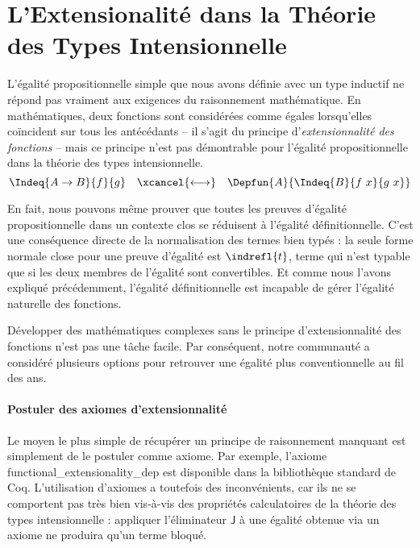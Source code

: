 \section{L'Extensionalité dans la Théorie des Types Intensionnelle}

L'égalité propositionnelle simple que nous avons définie avec un type inductif 
ne répond pas vraiment aux exigences du raisonnement mathématique. 
% 
En mathématiques, deux fonctions sont considérées comme égales lorsqu'elles 
coïncident sur tous les antécédants -- il s'agit du principe 
d'\emph{extensionnalité des fonctions} -- 
% 
% 
mais ce principe n'est pas démontrable pour l'égalité propositionnelle dans 
la théorie des types intensionnelle.
\[
  \Indeq{A \to B}{f}{g} \quad \xcancel{\longleftrightarrow} \quad \Depfun{A}{\Indeq{B}{f\ x}{g\ x}}
\]

En fait, nous pouvons même prouver que toutes les preuves d'égalité 
propositionnelle dans un contexte clos se réduisent à l'égalité définitionnelle. 
% 
C'est une conséquence directe de la normalisation des termes bien typés : 
la seule forme normale close pour une preuve d'égalité est \( \indrefl{t} \), 
terme qui n'est typable que si les deux membres de l'égalité sont convertibles. 
% 
Et comme nous l'avons expliqué précédemment, l'égalité définitionnelle est 
incapable de gérer l'égalité naturelle des fonctions. 

Développer des mathématiques complexes sans le principe d'extensionnalité 
des fonctions n'est pas une tâche facile. Par conséquent, notre communauté a 
considéré plusieurs options pour retrouver une égalité plus conventionnelle au 
fil des ans.

\paragraph*{Postuler des axiomes d'extensionnalité}
% 
Le moyen le plus simple de récupérer un principe de raisonnement manquant 
est simplement de le postuler comme axiome. 
% 
% 
Par exemple, l'axiome \textsf{functional\_extensionality\_dep} est disponible 
dans la bibliothèque standard de Coq. 
% 
L'utilisation d'axiomes a toutefois des inconvénients, car ils ne se comportent 
pas très bien vis-à-vis des propriétés calculatoires de la théorie des types 
intensionnelle : appliquer l'éliminateur \( \mathsf{J} \) à une égalité obtenue 
via un axiome ne produira qu'un terme bloqué.

